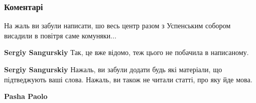  
 
 
 
 
\subsubsection{Коментарі}
\label{sec:07_08_2021.fb.fb_group.story_kiev_ua.1.kiev_1944.cmt}

\begin{itemize}
 
На жаль ви забули написати, шо весь центр разом з Успенським собором висадили в повітря саме комуняки...

\begin{itemize}
 

\textbf{Sergiy Sangurskiy} Так, це вже відомо, теж цього не побачила в написаному.


 
\textbf{Sergiy Sangurskiy} Нажаль, ви забули додати будь які матеріали, що
підтведжують ваші слова. Нажаль, ви також не читали статті, про яку йде мова.

\begin{itemize}
 
\textbf{Pasha Paolo} 


\end{itemize}
\end{itemize}
\end{itemize}
